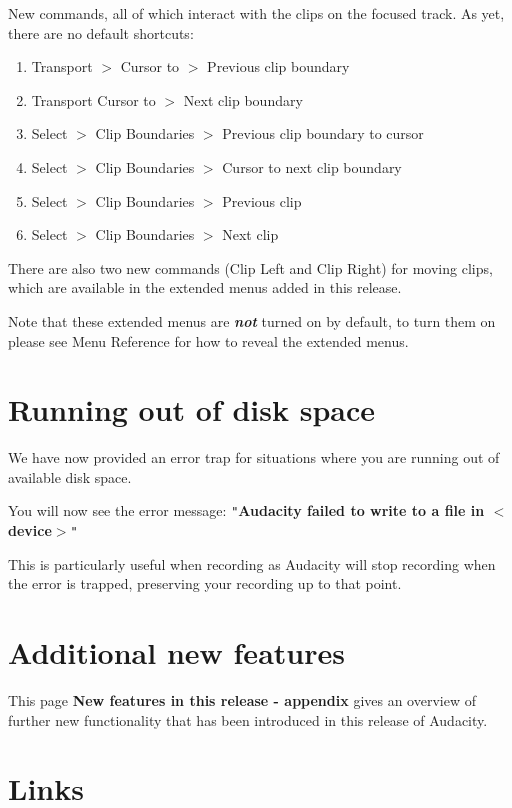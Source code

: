 New commands, all of which interact with the clips on the focused track. As yet, there are no default shortcuts:
\begin{enumerate}
\item Transport \mbox{$>$} Cursor to \mbox{$>$} Previous clip boundary
\item Transport Cursor to \mbox{$>$} Next clip boundary
\item Select \mbox{$>$} Clip Boundaries \mbox{$>$} Previous clip boundary to cursor 
\item Select \mbox{$>$} Clip Boundaries \mbox{$>$} Cursor to next clip boundary 
\item Select \mbox{$>$} Clip Boundaries \mbox{$>$} Previous clip 
\item Select \mbox{$>$} Clip Boundaries \mbox{$>$} Next clip 
\end{enumerate}
There are also two new commands (Clip Left and Clip Right) for moving clips, which are available in the extended menus added in this release.

Note that these extended menus are \textit{\textbf{not}} turned on by default, to turn them on please see Menu Reference for how to reveal the extended menus.


\section{Running out of disk space}


We have now provided an error trap for situations where you are running out of available disk space.

You will now see the error message:
\texttt{{}"{}}\textbf{Audacity failed to write to a file in \mbox{$<$}device\mbox{$>$}}\texttt{{}"{}}

This is particularly useful when recording as Audacity will stop recording when the error is trapped, preserving your recording up to that point.


\section{Additional new features}


This page \textbf{New features in this release - appendix} gives an overview of further new functionality that has been introduced in this release of Audacity.


\section{Links}


